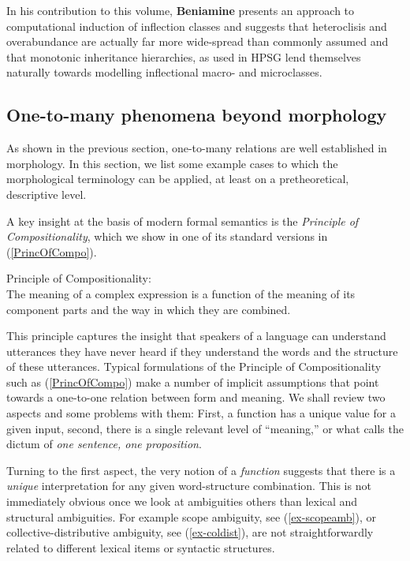 \documentclass[output=paper]{langscibook}
\begin{document}
In his contribution to this volume, \textbf{Beniamine} presents an
approach to computational induction of inflection classes and suggests
that heteroclisis and overabundance are actually far more wide-spread
than commonly assumed and that monotonic inheritance hierarchies, as
used in HPSG lend themselves naturally towards modelling inflectional
macro- and microclasses.

\subsection{One-to-many phenomena beyond morphology}

As shown in the previous section, one-to-many relations are well
established in morphology.  In this section, we list some example
cases to which the morphological terminology can be applied, at least
on a pretheoretical, descriptive level.

A key insight at the basis of modern formal semantics is the
\emph{Principle of Compositionality}, which we show in one of its
standard versions in (\ref{PrincOfCompo}).

\ea Principle of Compositionality:\\
The meaning of a complex expression is a function of the meaning of
its component parts and the way in which they are
combined.\label{PrincOfCompo}  \z

This principle captures the insight that speakers of a language can
understand utterances they have never heard if they understand the
words and the structure of these utterances.  Typical formulations
of the Principle of Compositionality such as (\ref{PrincOfCompo})
make a number of implicit assumptions that point towards a one-to-one
relation between form and meaning.  We shall review two aspects and
some problems with them: First, a function has a unique value for a
given input, second, there is a single relevant level of ``meaning,''
or what \cite{Bach:99} calls the dictum of \emph{one sentence, one
  proposition}.

Turning to the first aspect, the very notion of a \emph{function}
suggests that there is a \emph{unique} interpretation for any given
word-structure combination.  This is not immediately obvious once we
look at ambiguities others than lexical and structural ambiguities.
For example scope ambiguity, see (\ref{ex-scopeamb}), or
collective-distributive ambiguity, see (\ref{ex-coldist}), are not
straightforwardly related to different lexical items or syntactic
structures.
\end{document}
